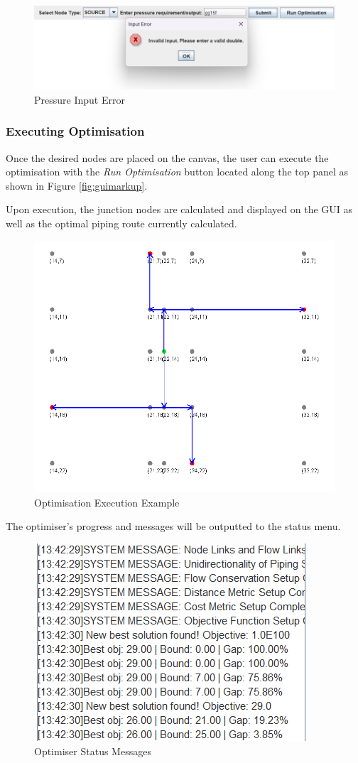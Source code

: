\begin{figure}[H]
    \centering
    \includegraphics[width=0.8\linewidth]{pressureerror.png}
    \caption{Pressure Input Error}
    \label{fig:pressureerror}
\end{figure}


\subsubsection{Executing Optimisation}
Once the desired nodes are placed on the canvas, the user can execute the optimisation with the \textit{Run Optimisation} button located along the top panel as shown in Figure \ref{fig:guimarkup}.

Upon execution, the junction nodes are calculated and displayed on the GUI as well as the optimal piping route currently calculated.
\begin{figure}[H]
    \centering
    \includegraphics[width=0.7\linewidth]{optimisationexecution.png}
    \caption{Optimisation Execution Example}
    \label{fig:optimisationexecuting}
\end{figure}

The optimiser's progress and messages will be outputted to the status menu.

\begin{figure}[H]
    \centering
    \includegraphics[width=0.5\linewidth]{optimiserprogress.png}
    \caption{Optimiser Status Messages}
    \label{fig:optimiserprogress}
\end{figure}

